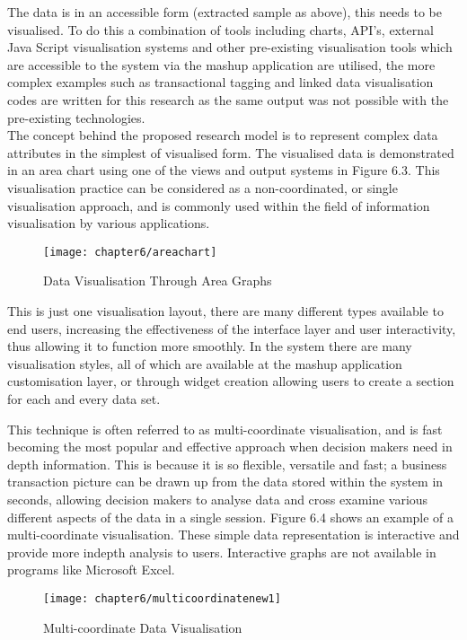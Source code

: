 The data is in an accessible form (extracted sample as above), this needs to be visualised. To do this a combination of tools including charts, API's, external Java Script visualisation systems and other pre-existing visualisation tools which are accessible to the system via the mashup application are utilised, the more complex examples such as transactional tagging and linked data visualisation codes are written for this research as the same output was not possible with the pre-existing technologies. \\

The concept behind the proposed research model is to represent complex data attributes in the simplest of visualised form. The visualised data is demonstrated in an area chart using one of the views and output systems in Figure 6.3. This visualisation practice can be considered as a non-coordinated, or single visualisation approach, and is commonly used within the field of information visualisation by various applications.\\

\begin{figure}[H]
\centering
\texttt{[image: chapter6/areachart]}
\caption{Data Visualisation Through Area Graphs}
\end{figure}

This is just one visualisation layout, there are many different types available to end users, increasing the effectiveness of the interface layer and user interactivity, thus allowing it to function more smoothly. In the system there are many visualisation styles, all of which are available at the mashup application customisation layer, or through widget creation allowing users to create a section for each and every data set. 

This technique is often referred to as multi-coordinate visualisation, and is fast becoming the most popular and effective approach when decision makers need in depth information. This is because it is so flexible, versatile and fast; a business transaction picture can be drawn up from the data stored within the system in seconds, allowing decision makers to analyse data and cross examine various different aspects of the data in a single session. Figure 6.4 shows an example of a multi-coordinate visualisation. These simple data representation is interactive and provide more indepth analysis to users. Interactive graphs are not available in programs like Microsoft Excel. 

\begin{figure}[H]
\centering
\texttt{[image: chapter6/multicoordinatenew1]}
\caption{Multi-coordinate Data Visualisation}
\end{figure}

